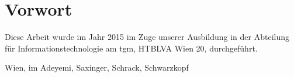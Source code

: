 

\chapter*{Vorwort}

Diese Arbeit wurde im Jahr 2015 im Zuge unserer Ausbildung in der Abteilung für Informationstechnologie am \gls{tgm}, HTBLVA Wien 20, durchgeführt. 


\bigskip


\bigskip
\bigskip
\bigskip
\bigskip



Wien, im \monthdis \hfill Adeyemi, Saxinger, Schrack, Schwarzkopf \vfill

